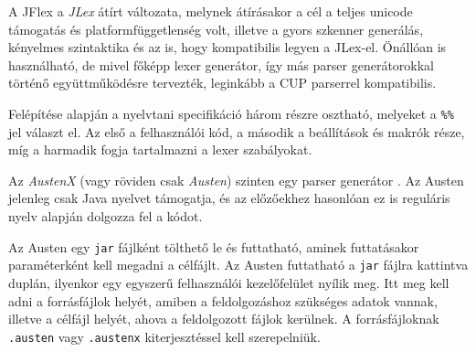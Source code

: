 A JFlex a \textit{JLex} átírt változata, melynek átírásakor a cél a teljes unicode támogatás és platformfüggetlenség volt, illetve a gyors szkenner generálás, kényelmes szintaktika és az is, hogy kompatibilis legyen a JLex-el. Önállóan is használható, de mivel főképp lexer generátor, így más parser generátorokkal történő együttműködésre tervezték, leginkább a CUP parserrel kompatibilis.

Felépítése alapján a nyelvtani specifikáció három részre osztható, melyeket a \texttt{\%\%} jel választ el. Az első a felhasználói kód, a második a beállítások és makrók része, míg a harmadik fogja tartalmazni a lexer szabályokat.



Az \textit{AustenX} (vagy röviden csak \textit{Austen}) szinten egy parser generátor \cite{austen}. Az Austen jelenleg csak Java nyelvet támogatja, és az előzőekhez hasonlóan ez is reguláris nyelv alapján dolgozza fel a kódot.

Az Austen egy \texttt{jar} fájlként tölthető le és futtatható, aminek futtatásakor paraméterként kell megadni a célfájlt. Az Austen futtatható a \texttt{jar} fájlra kattintva duplán, ilyenkor egy egyszerű felhasználói kezelőfelület nyílik meg. Itt meg kell adni a forrásfájlok helyét, amiben a feldolgozáshoz szükséges adatok vannak, illetve a célfájl helyét, ahova a feldolgozott fájlok kerülnek. A forrásfájloknak \texttt{.austen} vagy \texttt{.austenx} kiterjesztéssel kell szerepelniük.


